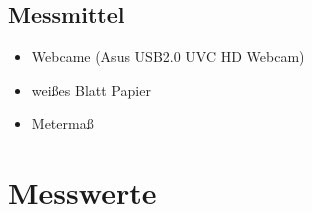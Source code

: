 \subsection{Messmittel}
\begin{itemize}
\item Webcame (Asus USB2.0 UVC HD Webcam)
\item weißes Blatt Papier
\item Metermaß
\end{itemize}


\section{Messwerte}
\label{chap:VERSUCH_3_MESSWERTE}

\begin{tabular}{c c c c c}


\end{tabular}
